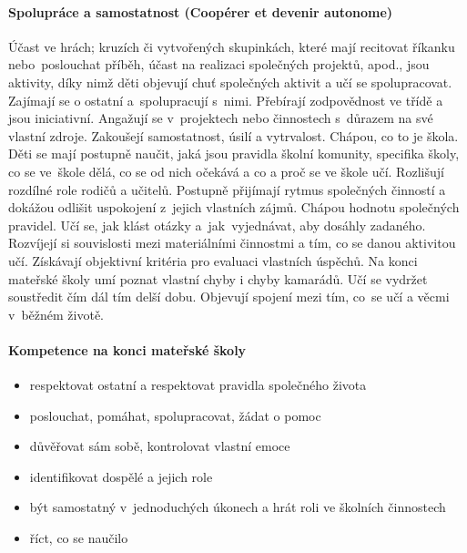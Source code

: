 			\paragraph{Spolupráce a samostatnost (Coopérer et devenir autonome)}
				Účast ve hrách; kruzích či vytvořených skupinkách, které mají recitovat říkanku nebo poslouchat příběh, účast na realizaci společných projektů, apod., jsou aktivity, díky nimž děti objevují chuť společných aktivit a učí se spolupracovat. Zajímají se o ostatní a spolupracují s nimi. Přebírají zodpovědnost ve třídě a jsou iniciativní. Angažují se v projektech nebo činnostech s důrazem na své vlastní zdroje. Zakoušejí samostatnost, úsilí a vytrvalost. Chápou, co to je škola.
				Děti se mají postupně naučit, jaká jsou pravidla školní komunity, specifika školy, co se ve škole dělá, co se od nich očekává a co a proč se ve škole učí. Rozlišují rozdílné role rodičů a učitelů. 
				Postupně přijímají rytmus společných činností a dokážou odlišit uspokojení z jejich vlastních zájmů. Chápou hodnotu společných pravidel. Učí se, jak klást otázky a jak vyjednávat, aby dosáhly zadaného. Rozvíjejí si souvislosti mezi materiálními činnostmi a tím, co se danou aktivitou učí. Získávají objektivní kritéria pro evaluaci vlastních úspěchů. Na konci mateřské školy umí poznat vlastní chyby i chyby kamarádů. Učí se vydržet soustředit čím dál tím delší dobu. Objevují spojení mezi tím, co se učí a věcmi v běžném životě.
			\paragraph{Kompetence na konci mateřské školy}
			\begin{itemize}
				\item respektovat ostatní a respektovat pravidla společného života
				\item poslouchat, pomáhat, spolupracovat, žádat o pomoc
				\item důvěřovat sám sobě, kontrolovat vlastní emoce
				\item identifikovat dospělé a jejich role
				\item být samostatný v jednoduchých úkonech a hrát roli ve školních činnostech
				\item říct, co se naučilo
				\end{itemize}

